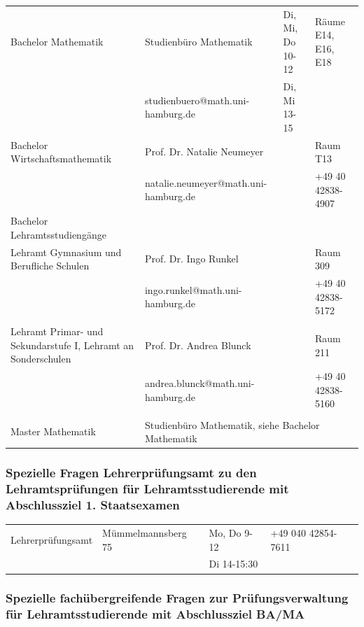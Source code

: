 
\begin{tabularx}{\textwidth}{|X|X|X|X|}
\hline Bachelor Mathematik&Studienbüro Mathematik&Di, Mi, Do \hfill 10-12
	&Räume E14, E16, E18\\
	&studienbuero@math.uni-hamburg.de&Di, Mi \hfill13-15&\\
\hline Bachelor Wirtschaftsmathematik %
&Prof. Dr. Natalie Neumeyer& \hfill &Raum T13\\
&natalie.neumeyer@math.uni-hamburg.de&&+49 40 42838-4907\\
\hline Bachelor Lehramtsstudiengänge&&&\\
Lehramt Gymnasium und Berufliche Schulen&Prof. Dr. Ingo Runkel&&Raum 309\\
    &ingo.runkel@math.uni-hamburg.de&&+49 40 42838-5172\\
    &&&\\
Lehramt Primar- und Sekundarstufe I, Lehramt an Sonderschulen
    &Prof. Dr. Andrea Blunck& \hfill &Raum 211\\
    &andrea.blunck@math.uni-hamburg.de&&+49 40 42838-5160\\
    &&&\\
\hline Master Mathematik
    &\multicolumn{3}{|l|}{Studienbüro Mathematik, siehe Bachelor Mathematik}\\
\hline
\end{tabularx}

\subsubsection{Spezielle Fragen Lehrerprüfungsamt zu den Lehramtsprüfungen für Lehramtsstudierende mit Abschlussziel 1. Staatsexamen
}

\begin{tabularx}{\textwidth}{|X|X|X|X|}
\hline Lehrerprüfungsamt&Mümmelmannsberg 75&Mo, Do \hfill 9-12
    &+49 040 42854-7611\\
    &&Di \hfill 14-15:30&\\
\hline
\end{tabularx}

\subsubsection{Spezielle fachübergreifende Fragen zur Prüfungsverwaltung für Lehramtsstudierende mit Abschlussziel BA/MA}

